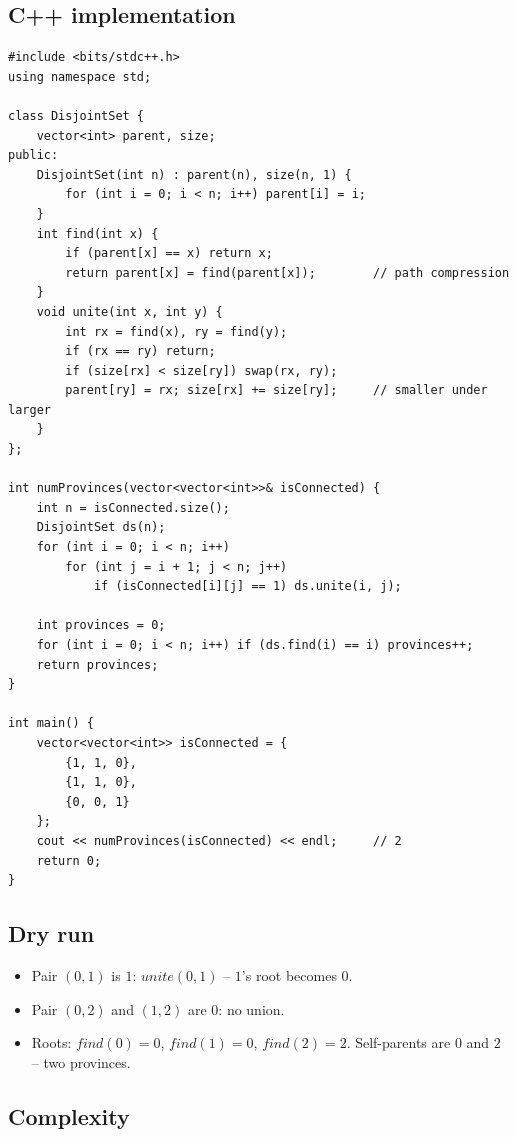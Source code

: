 \subsection*{C++ implementation}

\begin{lstlisting}
#include <bits/stdc++.h>
using namespace std;

class DisjointSet {
    vector<int> parent, size;
public:
    DisjointSet(int n) : parent(n), size(n, 1) {
        for (int i = 0; i < n; i++) parent[i] = i;
    }
    int find(int x) {
        if (parent[x] == x) return x;
        return parent[x] = find(parent[x]);        // path compression
    }
    void unite(int x, int y) {
        int rx = find(x), ry = find(y);
        if (rx == ry) return;
        if (size[rx] < size[ry]) swap(rx, ry);
        parent[ry] = rx; size[rx] += size[ry];     // smaller under larger
    }
};

int numProvinces(vector<vector<int>>& isConnected) {
    int n = isConnected.size();
    DisjointSet ds(n);
    for (int i = 0; i < n; i++)
        for (int j = i + 1; j < n; j++)
            if (isConnected[i][j] == 1) ds.unite(i, j);

    int provinces = 0;
    for (int i = 0; i < n; i++) if (ds.find(i) == i) provinces++;
    return provinces;
}

int main() {
    vector<vector<int>> isConnected = {
        {1, 1, 0},
        {1, 1, 0},
        {0, 0, 1}
    };
    cout << numProvinces(isConnected) << endl;     // 2
    return 0;
}
\end{lstlisting}

\subsection*{Dry run}


\begin{itemize}
  \item Pair $(0,1)$ is $1$: $\textit{unite}(0,1)$ -- $1$'s root becomes
        $0$.
  \item Pair $(0,2)$ and $(1,2)$ are $0$: no union.
  \item Roots: $\textit{find}(0)=0$, $\textit{find}(1)=0$,
        $\textit{find}(2)=2$. Self-parents are $0$ and $2$ -- two
        provinces.
\end{itemize}

\subsection*{Complexity}

